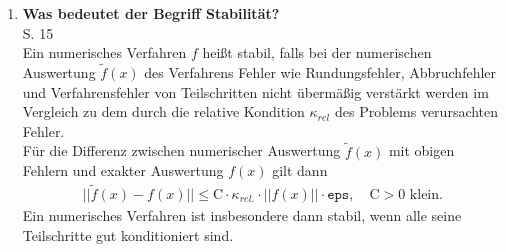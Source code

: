 \begin{enumerate}
		\item \textbf{Was bedeutet der Begriff Stabilität?} \\
		S. 15\\
		Ein numerisches Verfahren $f$ heißt stabil, falls bei der numerischen Auswertung $\tilde{f}(x)$ des Verfahrens Fehler wie Rundungsfehler, Abbruchfehler und Verfahrensfehler von Teilschritten nicht	übermäßig verstärkt werden im Vergleich zu dem durch die relative Kondition $\kappa_{rel}$ des Problems verursachten Fehler. \\
		Für die Differenz zwischen numerischer Auswertung $\tilde{f}(x)$ mit obigen Fehlern und exakter Auswertung $f(x)$ gilt dann
		\begin{align*}
			||\tilde{f}(x)-f(x)||\leq \text{C}\cdot\kappa_{rel.}\cdot||f(x)||\cdot\texttt{eps}, \quad \text{C} > 0 \text{ klein.}
		\end{align*}
		Ein numerisches Verfahren ist insbesondere dann stabil, wenn alle seine Teilschritte gut konditioniert sind.
		
	\end{enumerate}